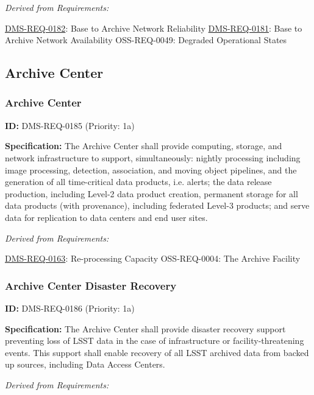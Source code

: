 \documentclass[SE,toc,lsstdraft]{lsstdoc}
\begin{document}
\emph{Derived from Requirements:}

\hyperref[DMS-REQ-0182]{DMS-REQ-0182}:
Base to Archive Network Reliability \newline
\hyperref[DMS-REQ-0181]{DMS-REQ-0181}:
Base to Archive Network Availability \newline
OSS-REQ-0049:
Degraded Operational States \newline

\subsection{Archive Center}

\subsubsection{Archive Center}

\label{DMS-REQ-0185}
\textbf{ID:} DMS-REQ-0185 (Priority: 1a)

\textbf{Specification:} The Archive Center shall provide computing, storage, and network infrastructure to support, simultaneously: nightly processing including image processing, detection, association, and moving object pipelines, and the generation of all time-critical data products, i.e. alerts; the data release production, including Level-2 data product creation, permanent storage for all data products (with provenance), including federated Level-3 products; and serve data for replication to data centers and end user sites.

\emph{Derived from Requirements:}

\hyperref[DMS-REQ-0163]{DMS-REQ-0163}:
Re-processing Capacity \newline
OSS-REQ-0004:
The Archive Facility \newline

\subsubsection{Archive Center Disaster Recovery}

\label{DMS-REQ-0186}
\textbf{ID:} DMS-REQ-0186 (Priority: 1a)

\textbf{Specification:} The Archive Center shall provide disaster recovery support preventing loss of LSST data in the case of infrastructure or facility-threatening events.  This support shall enable recovery of all LSST archived data from backed up sources, including Data Access Centers.

\emph{Derived from Requirements:}
\end{document}
